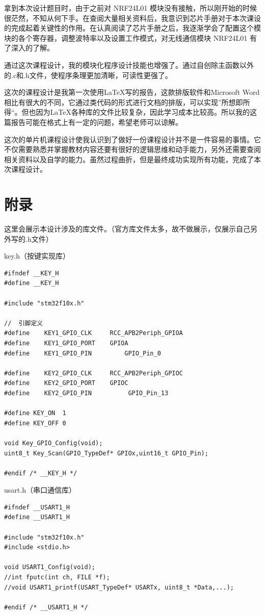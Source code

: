 \documentclass[UTF8,a4paper,11pt]{article}
\begin{document}
拿到本次设计题目时，由于之前对 NRF24L01 模块没有接触，所以刚开始的时候很茫然，不知从何下手。在查阅大量相关资料后，我意识到芯片手册对于本次课设的完成起着关键性的作用。在认真阅读了芯片手册之后，我逐渐学会了配置这个模块的各个寄存器，调整波特率以及设置工作模式，对无线通信模块 NRF24L01 有了深入的了解。

通过这次课程设计，我的模块化程序设计技能也增强了。通过自创除主函数以外的.c和.h文件，使程序条理更加清晰，可读性更强了。

这次的课程设计是我第一次使用\LaTeX 写的报告，这款排版软件和Microsoft Word相比有很大的不同，它通过类代码的形式进行文档的排版，可以实现”所想即所得“。但也因为\LaTeX 各种库的文件比较复杂，因此学习成本比较高。所以我的这篇报告可能在格式上有一定的问题，希望老师可以谅解。

这次的单片机课程设计使我认识到了做好一份课程设计并不是一件容易的事情。它不仅需要熟悉并掌握教材内容还要有很好的逻辑思维和动手能力，另外还需要查阅相关资料以及自学的能力。虽然过程曲折，但是最终成功实现所有功能，完成了本次课程设计。

\clearpage

\section*{附录}
这里会展示本设计涉及的库文件。（官方库文件太多，故不做展示，仅展示自己另外写的.h文件）

key.h（按键实现库）
\begin{lstlisting}[caption={}]
#ifndef __KEY_H
#define	__KEY_H

#include "stm32f10x.h"

//  引脚定义
#define    KEY1_GPIO_CLK     RCC_APB2Periph_GPIOA
#define    KEY1_GPIO_PORT    GPIOA			   
#define    KEY1_GPIO_PIN		 GPIO_Pin_0

#define    KEY2_GPIO_CLK     RCC_APB2Periph_GPIOC
#define    KEY2_GPIO_PORT    GPIOC		   
#define    KEY2_GPIO_PIN		  GPIO_Pin_13

#define KEY_ON	1
#define KEY_OFF	0

void Key_GPIO_Config(void);
uint8_t Key_Scan(GPIO_TypeDef* GPIOx,uint16_t GPIO_Pin);

#endif /* __KEY_H */
\end{lstlisting}

usart.h（串口通信库）
\begin{lstlisting}[caption={}]
#ifndef __USART1_H
#define	__USART1_H

#include "stm32f10x.h"
#include <stdio.h>

void USART1_Config(void);
//int fputc(int ch, FILE *f);
//void USART1_printf(USART_TypeDef* USARTx, uint8_t *Data,...);

#endif /* __USART1_H */
\end{lstlisting}
\end{document}
